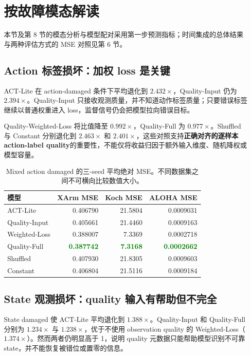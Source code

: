 \documentclass[11pt,a4paper]{ctexart}
\newcommand{\good}[1]{\textcolor{green}{\bfseries #1}}
\begin{document}
\section{按故障模态解读}

本节及第 8 节的模态分析与模型配对采用第一步预测指标；时间集成的总体结果与两种评估方式的 MSE 对照见第 6 节。

\subsection{Action 标签损坏：加权 loss 是关键}

ACT-Lite 在 action-damaged 条件下平均退化到 $2.432\times$，Quality-Input 仍为 $2.394\times$。Quality-Input 只接收观测质量，并不知道动作标签质量；只要错误标签继续以普通权重进入 loss，监督信号仍会把模型拉向错误目标。

Quality-Weighted-Loss 将比值降至 $0.992\times$，Quality-Full 为 $0.977\times$。Shuffled 与 Constant 分别退化到 $2.463\times$ 和 $2.401\times$，这些对照支持\textbf{正确对齐的逐样本 action-label quality}的重要性，不能仅将收益归因于额外输入维度、随机降权或模型容量。

\begin{table}[htbp]
\centering
\small
\begin{tabularx}{\linewidth}{Y rrr}
\toprule
模型 & XArm MSE & Koch MSE & ALOHA MSE\\
\midrule
ACT-Lite & 0.406790 & 21.5804 & 0.0009031\\
Quality-Input & 0.405661 & 21.4460 & 0.0009163\\
Weighted-Loss & 0.388007 & 7.3369 & 0.0002718\\
Quality-Full & \good{0.387742} & \good{7.3168} & \good{0.0002662}\\
Shuffled & 0.407930 & 21.8305 & 0.0009603\\
Constant & 0.406804 & 21.5116 & 0.0009184\\
\bottomrule
\end{tabularx}
\caption{Mixed action damaged 的三-seed 平均绝对 MSE。不同数据集之间不可横向比较数值大小。}
\end{table}

\subsection{State 观测损坏：quality 输入有帮助但不完全}

State damaged 使 ACT-Lite 平均退化到 $1.388\times$。Quality-Input 和 Quality-Full 分别为 $1.234\times$ 与 $1.238\times$，优于不使用 observation quality 的 Weighted-Loss（$1.374\times$）。然而两者仍明显高于 1，说明 quality 元数据只能帮助模型识别不可靠 state，并不能恢复被错位或置零的信息。
\end{document}
